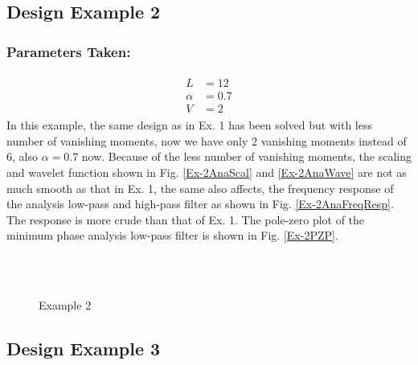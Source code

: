 \subsection{Design Example 2}
\label{Design Example 2}
\subsubsection{Parameters Taken:}
\begin{eqnarray*}
\begin{aligned}
L &= 12\\
\alpha &= 0.7\\
V &= 2
\end{aligned}
\end{eqnarray*}
In this example, the same design as in Ex. 1 has been solved but with less number of vanishing moments, now we have only $2$ vanishing moments instead of $6$, also $\alpha = 0.7$ now. Because of the less number of vanishing moments, the scaling and wavelet function shown in Fig. \ref{Ex-2AnaScal} and \ref{Ex-2AnaWave} are not as much smooth as that in Ex. 1, the same also affects, the frequency response of the analysis low-pass and high-pass filter as shown in Fig. \ref{Ex-2AnaFreqResp}. The response is more crude than that of Ex. 1. The pole-zero plot of the minimum phase analysis low-pass filter is shown in Fig. \ref{Ex-2PZP}. 

\begin{figure*}
\centering
{}
\\
\\

\caption{Example 2}
\label{Example 2}
\end{figure*}
\subsection{Design Example 3}
\label{Design Example 3}
